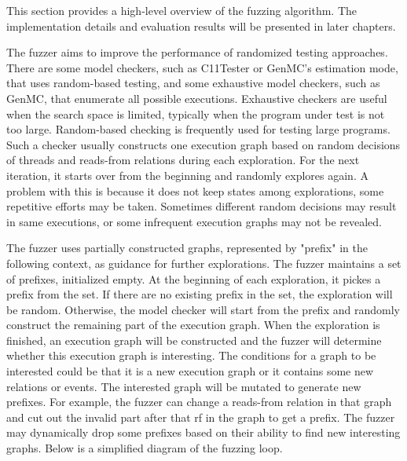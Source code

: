 This section provides a high-level overview of the fuzzing algorithm. The implementation details and evaluation results will be presented in later chapters.

The fuzzer aims to improve the performance of randomized testing approaches. There are some model checkers, such as C11Tester or GenMC's estimation mode, that uses random-based testing, and some exhaustive model checkers, such as GenMC, that enumerate all possible executions. Exhaustive checkers are useful when the search space is limited, typically when the program under test is not too large. Random-based checking is frequently used for testing large programs. Such a checker usually constructs one execution graph based on random decisions of threads and reads-from relations during each exploration. For the next iteration, it starts over from the beginning and randomly explores again. A problem with this is because it does not keep states among explorations, some repetitive efforts may be taken. Sometimes different random decisions may result in same executions, or some infrequent execution graphs may not be revealed. 

The fuzzer uses partially constructed graphs, represented by "prefix" in the following context, as guidance for further explorations. 
The fuzzer maintains a set of prefixes, initialized empty. At the beginning of each exploration, it pickes a prefix from the set. If there are no existing prefix in the set, the exploration will be random. Otherwise, the model checker will start from the prefix and randomly construct the remaining part of the execution graph. When the exploration is finished, an execution graph will be constructed and the fuzzer will determine whether this execution graph is interesting. The conditions for a graph to be interested could be that it is a new execution graph or it contains some new relations or events. The interested graph will be mutated to generate new prefixes. For example, the fuzzer can change a reads-from relation in that graph and cut out the invalid part after that rf in the graph to get a prefix. The fuzzer may dynamically drop some prefixes based on their ability to find new interesting graphs. Below is a simplified diagram of the fuzzing loop.



